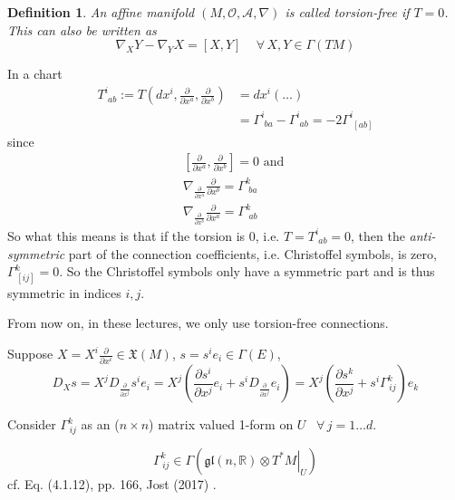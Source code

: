 \documentclass[10pt]{amsart}
\newtheorem{definition}{Definition}
\begin{document}
\begin{multicols*}{2}
\begin{definition}
	An affine manifold $(M, \mathcal{O}, \mathcal{A}, \nabla)$ is called torsion-free if $T=0$. This can also be written as
	\begin{equation}
		\nabla_X Y - \nabla_Y X = [X,Y] \quad \, \forall \, X, Y \in \Gamma(TM)
	\end{equation}	
\end{definition}

In a chart 
\[
\begin{aligned}
	T^i_{ \, \, ab } := T\left(dx^i , \frac{ \partial }{ \partial x^a} , \frac{ \partial }{ \partial x^b}  \right) & = dx^i ( \dots ) \\ 
	& = \Gamma^i_{ \, \, ba} - \Gamma^i_{ \, \, ab} = -2 \Gamma^i_{ \, \, [ab] }
\end{aligned}
\]
since
\[
\begin{gathered}
	[\frac{ \partial }{ \partial x^a}, \frac{ \partial }{ \partial x^b}] = 0 \text{ and } \\
	\nabla_{\frac{ \partial }{ \partial x^a} } \frac{ \partial }{ \partial x^b} = \Gamma^k_{\, \, ba} \\
	\nabla_{\frac{ \partial }{ \partial x^b} } \frac{ \partial }{ \partial x^a} = \Gamma^k_{\, \, ab} 
\end{gathered}\]
So what this means is that if the torsion is $0$, i.e. $T = T^i_{\, \, ab} = 0$, then the \emph{anti-symmetric} part of the connection coefficients, i.e. Christoffel symbols, is zero, $\Gamma^k_{\, [ij]} = 0$. So the Christoffel symbols only have a symmetric part and is thus symmetric in indices $i, j$.

From now on, in these lectures, we only use torsion-free connections. 



Suppose $X = X^i \frac{\partial}{\partial x^i} \in \mathfrak{X}(M)$, $s = s^i e_i \in \Gamma(E)$,
\[
D_X s =X^j D_{\frac{\partial }{ \partial x^j} } s^i e_i = X^j \left( \frac{\partial s^i}{\partial x^j} e_i + s^i D_{\frac{\partial }{\partial x^j} } e_i \right) = X^j \left( \frac{\partial s^k}{\partial x^j } + s^i \Gamma^k_{\, ij} \right) e_k
\]

Consider $\Gamma^k_{\, ij}$ as an ($n\times n$) matrix valued 1-form on $U$ \, $\forall \, j = 1 \dots d$.

\begin{equation}
	\Gamma^k_{\, ij} \in \Gamma( \mathfrak{gl}(n, \mathbb{R}) \otimes \left. T^* M \right|_U)
\end{equation}
cf. Eq. (4.1.12), pp. 166, Jost (2017) \cite{Jost2017}.


\end{multicols*}
\end{document}
